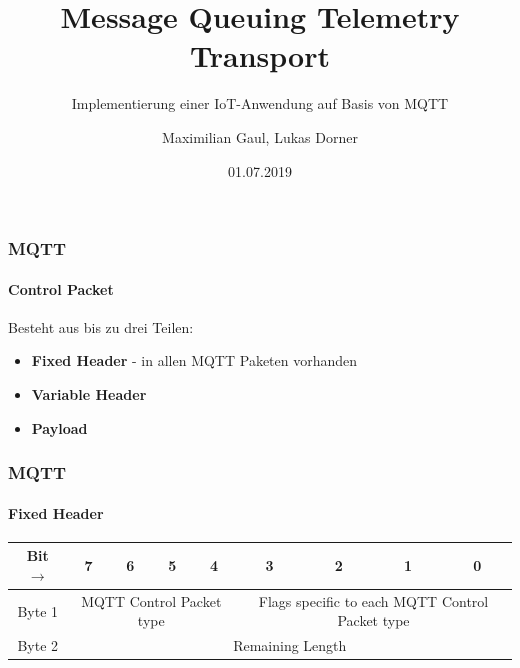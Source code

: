 \documentclass{beamer}
\title{Message Queuing Telemetry Transport}
\subtitle{Implementierung einer IoT-Anwendung auf Basis von MQTT}
\author{Maximilian Gaul, Lukas Dorner}
\date{01.07.2019}
\begin{document}
	
\begin{frame}
	\titlepage
\end{frame}

\begin{frame}

\frametitle{MQTT}
\framesubtitle{Control Packet}
Besteht aus bis zu drei Teilen:
\begin{itemize}
	\item \textbf{Fixed Header} - in allen MQTT Paketen vorhanden
	\item \textbf{Variable Header}
	\item \textbf{Payload}
\end{itemize}

\end{frame}

\begin{frame}

\frametitle{MQTT}
\framesubtitle{Fixed Header}
\begin{tabular}{c|c|c|c|c|c|c|c|c}
	\hline
	\textbf{Bit $\rightarrow$} & 7 & 6 & 5 & 4 & 3 & 2 & 1 & 0\\
	\hline
	Byte 1 & \multicolumn{4}{|c|}{MQTT Control Packet type} & \multicolumn{4}{c}{Flags specific to each MQTT Control Packet type}\\
	\hline
	Byte 2 & \multicolumn{8}{c}{Remaining Length}\\
	\hline
\end{tabular}

\end{frame}
\end{document}
